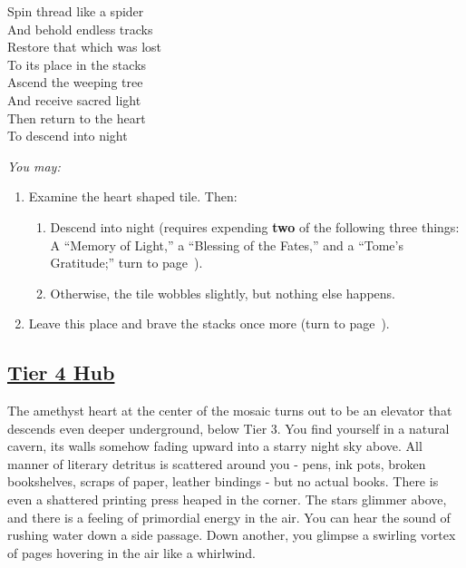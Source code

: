 \documentclass[sheet]{GL2020}
\begin{document}
\begin{center}
Spin thread like a spider\\
And behold endless tracks \\
\vspace{0.25cm}
Restore that which was lost\\
To its place in the stacks\\
\vspace{0.25cm}
Ascend the weeping tree\\
And receive sacred light\\
\vspace{0.25cm}
Then return to the heart\\
To descend into night\\
\end{center}

\vspace{0.5cm}

\begingroup
\itshape
You may:
\begin{enumerate}[A]
  \item Examine the heart shaped tile. Then:
	\begin{enumerate}
		\item Descend into night (requires expending \textbf{two} of the following three things: A ``Memory of Light,'' a ``Blessing of the Fates,'' and a ``Tome’s Gratitude;'' turn to page~\pageref{TierFourHub}).
		\item Otherwise, the tile wobbles slightly, but nothing else happens.
	\end{enumerate}
	\item Leave this place and brave the stacks once more (turn to page~\pageref{DeeperStacks}).
\end{enumerate}
\endgroup

\clearpage

\begin{center}\section*{\underline{Tier 4 Hub}}\end{center}
\label{TierFourHub}

The amethyst heart at the center of the mosaic turns out to be an elevator that descends even deeper underground, below Tier 3. You find yourself in a natural cavern, its walls somehow fading upward into a starry night sky above. All manner of literary detritus is scattered around you - pens, ink pots, broken bookshelves, scraps of paper, leather bindings - but no actual books. There is even a shattered printing press heaped in the corner. The stars glimmer above, and there is a feeling of primordial energy in the air. You can hear the sound of rushing water down a side passage. Down another, you glimpse a swirling vortex of pages hovering in the air like a whirlwind.
\end{document}
